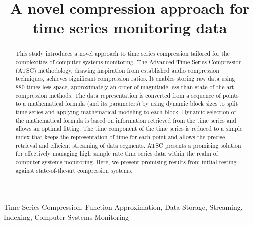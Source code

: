 \documentclass[conference]{IEEEtran}
\begin{document}
\title{A novel compression approach for time series monitoring data\\}

\author{
\and
{}
\and
{}
}

\maketitle

\begin{abstract}
    This study introduces a novel approach to time series compression tailored for the complexities of computer systems monitoring.
    The Advanced Time Series Compression (ATSC) methodology, drawing inspiration from established audio compression techniques, achieves significant compression ratios. It enables storing raw data using 880 times less space, approximately an order of magnitude less than state-of-the-art compression methods.
    The data representation is converted from a sequence of points to a mathematical formula (and its parameters) by using dynamic block sizes to split time series and applying mathematical modeling to each block.
    Dynamic selection of the mathematical formula is based on information retrieved from the time series and allows an optimal fitting.
    The time component of the time series is reduced to a simple index that keeps the representation of time for each point and allows the precise retrieval and efficient streaming of data segments. 
    ATSC presents a promising solution for effectively managing high sample rate time series data within the realm of computer systems monitoring.
    Here, we present promising results from initial testing against state-of-the-art compression systems. 
\end{abstract}
\vspace{5pt}
\begin{IEEEkeywords}
Time Series Compression, Function Approximation, Data Storage, Streaming, Indexing, Computer Systems Monitoring
\end{IEEEkeywords}
\end{document}
